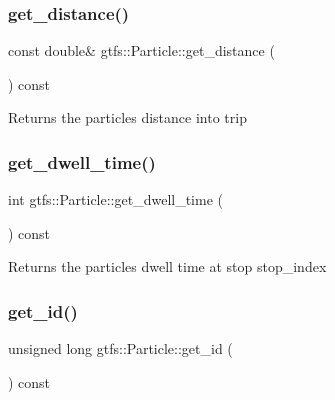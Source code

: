 \subsubsection{\texorpdfstring{get\+\_\+distance()}{get\_distance()}}
{\footnotesize\ttfamily const double\& gtfs\+::\+Particle\+::get\+\_\+distance (\begin{DoxyParamCaption}{ }\end{DoxyParamCaption}) const\hspace{0.3cm}{\ttfamily [inline]}}

\begin{DoxyReturn}{Returns}
the particle\textquotesingle{}s distance into trip 
\end{DoxyReturn}
\mbox{\label{classgtfs_1_1Particle_aaea44cde86b5b026c94800c6d837f174}} 
\subsubsection{\texorpdfstring{get\+\_\+dwell\+\_\+time()}{get\_dwell\_time()}}
{\footnotesize\ttfamily int gtfs\+::\+Particle\+::get\+\_\+dwell\+\_\+time (\begin{DoxyParamCaption}{ }\end{DoxyParamCaption}) const\hspace{0.3cm}{\ttfamily [inline]}}

\begin{DoxyReturn}{Returns}
the particle\textquotesingle{}s dwell time at stop {\ttfamily stop\+\_\+index} 
\end{DoxyReturn}
\mbox{\label{classgtfs_1_1Particle_a3131eb93ac902a4cccf42061e1a7296b}} 
\subsubsection{\texorpdfstring{get\+\_\+id()}{get\_id()}}
{\footnotesize\ttfamily unsigned long gtfs\+::\+Particle\+::get\+\_\+id (\begin{DoxyParamCaption}{ }\end{DoxyParamCaption}) const}

